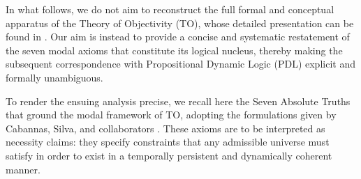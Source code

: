 \documentclass[11pt,a4paper]{article}
\begin{document}
In what follows, we do not aim to reconstruct the full formal and conceptual apparatus of the Theory of Objectivity (TO), whose detailed presentation can be found in \cite{Cabannas_Silva_TO_book,Cabannas_Silva_TO_neutrinos,Theory_Objectivity_Web}. Our aim is instead to provide a concise and systematic restatement of the seven modal axioms that constitute its logical nucleus, thereby making the subsequent correspondence with Propositional Dynamic Logic (PDL) explicit and formally unambiguous.

To render the ensuing analysis precise, we recall here the Seven Absolute Truths that ground the modal framework of TO, adopting the formulations given by Cabannas, Silva, and collaborators \cite{Cabannas_Silva_TO_book,Cabannas_Silva_TO_neutrinos}. These axioms are to be interpreted as necessity claims: they specify constraints that any admissible universe must satisfy in order to exist in a temporally persistent and dynamically coherent manner.
\end{document}
